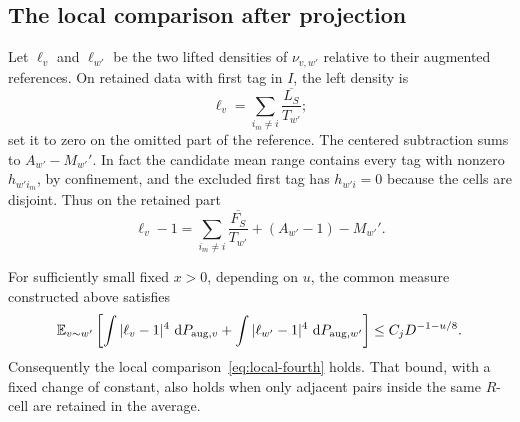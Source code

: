 \subsection{The local comparison after projection}

Let $\ell_v$ and $\ell_{w'}$ be the two lifted densities of
$\nu_{v,w'}$ relative to their augmented references.  On retained
data with first tag in $I$, the left density is
\[
                  \ell_v=\sum_{i_m\ne i}\frac{\overline{L_S}}{T_{w'}};
\]
set it to zero on the omitted part of the reference.  The centered
subtraction sums to $A_{w'}-M_{w'}'$.  In fact the candidate mean
range contains every tag with nonzero $h_{w'i_m}$, by confinement,
and the excluded first tag has $h_{w'i}=0$ because the cells are
disjoint.  Thus on the retained part
\begin{equation}\label{eq:local-lift-error}
 \ell_v-1=\sum_{i_m\ne i}\frac{\overline{F_S}}{T_{w'}}
                              +(A_{w'}-1)-M_{w'}'.
\end{equation}

\begin{proposition}\label{prop:local-palm}
For sufficiently small fixed $x>0$, depending on $u$, the common
measure constructed above satisfies
\begin{equation}\label{eq:local-lift-fourth}
 \mathbb E_{v\sim w'}\left[
       \int|\ell_v-1|^4\,\,\mathrm d P_{\mathrm{aug},v}
       +\int|\ell_{w'}-1|^4\,\,\mathrm d P_{\mathrm{aug},w'}\right]
                         \le C_jD^{-1-u/8}.
\end{equation}
Consequently the local comparison~\eqref{eq:local-fourth} holds.
That bound, with a fixed change of constant, also holds when only
adjacent pairs inside the same $R$-cell are retained in the average.
\end{proposition}

